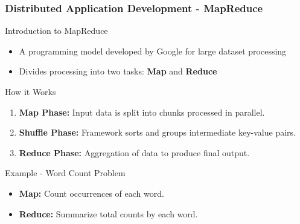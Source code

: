 \documentclass[aspectratio=169]{beamer}
\begin{document}
\begin{frame}[fragile]
    \frametitle{Distributed Application Development - MapReduce}
    \begin{block}{Introduction to MapReduce}
        \begin{itemize}
            \item A programming model developed by Google for large dataset processing
            \item Divides processing into two tasks: \textbf{Map} and \textbf{Reduce}
        \end{itemize}
    \end{block}

    \begin{block}{How it Works}
        \begin{enumerate}
            \item \textbf{Map Phase:} Input data is split into chunks processed in parallel.
            \item \textbf{Shuffle Phase:} Framework sorts and groups intermediate key-value pairs.
            \item \textbf{Reduce Phase:} Aggregation of data to produce final output.
        \end{enumerate}
    \end{block}

    \begin{block}{Example - Word Count Problem}
        \begin{itemize}
            \item \textbf{Map:} Count occurrences of each word.
            \item \textbf{Reduce:} Summarize total counts by each word.
        \end{itemize}
    \end{block}
\end{frame}
\end{document}
